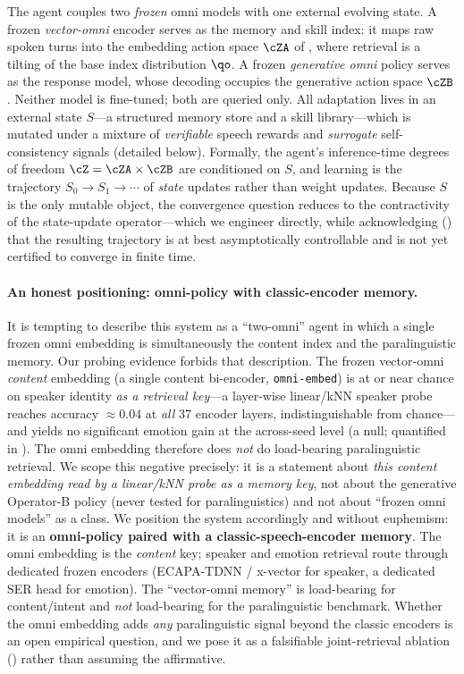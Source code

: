 The agent couples two \emph{frozen} omni models with one external evolving state. A frozen \emph{vector-omni} encoder \citep{omniembed2025,omniembedaudio2026} serves as the memory and skill index: it maps raw spoken turns into the embedding action space $\cZA$ of , where retrieval is a tilting of the base index distribution $\qo$. A frozen \emph{generative omni} policy \citep{qwen3omni} serves as the response model, whose decoding occupies the generative action space $\cZB$. Neither model is fine-tuned; both are queried only. All adaptation lives in an external state $S$---a structured memory store and a skill library---which is mutated under a mixture of \emph{verifiable} speech rewards and \emph{surrogate} self-consistency signals (detailed below). Formally, the agent's inference-time degrees of freedom $\cZ = \cZA \times \cZB$ are conditioned on $S$, and learning is the trajectory $S_0 \to S_1 \to \cdots$ of \emph{state} updates rather than weight updates. Because $S$ is the only mutable object, the convergence question reduces to the contractivity of the state-update operator---which we engineer directly, while acknowledging () that the resulting trajectory is at best asymptotically controllable and is not yet certified to converge in finite time.

\paragraph{An honest positioning: omni-policy with classic-encoder memory.} It is tempting to describe this system as a ``two-omni'' agent in which a single frozen omni embedding is simultaneously the content index and the paralinguistic memory. Our probing evidence forbids that description. The frozen vector-omni \emph{content} embedding (a single content bi-encoder, \texttt{omni-embed}) is at or near chance on speaker identity \emph{as a retrieval key}---a layer-wise linear/kNN speaker probe reaches accuracy $\approx 0.04$ at \emph{all} 37 encoder layers, indistinguishable from chance---and yields no significant emotion gain at the across-seed level (a null; quantified in ). The omni embedding therefore does \emph{not} do load-bearing paralinguistic retrieval. We scope this negative precisely: it is a statement about \emph{this content embedding read by a linear/kNN probe as a memory key}, not about the generative Operator-B policy (never tested for paralinguistics) and not about ``frozen omni models'' as a class. We position the system accordingly and without euphemism: it is an \textbf{omni-policy paired with a classic-speech-encoder memory}. The omni embedding is the \emph{content} key; speaker and emotion retrieval route through dedicated frozen encoders (ECAPA-TDNN / x-vector for speaker, a dedicated SER head for emotion). The ``vector-omni memory'' is load-bearing for content/intent and \emph{not} load-bearing for the paralinguistic benchmark. Whether the omni embedding adds \emph{any} paralinguistic signal beyond the classic encoders is an open empirical question, and we pose it as a falsifiable joint-retrieval ablation () rather than assuming the affirmative.

